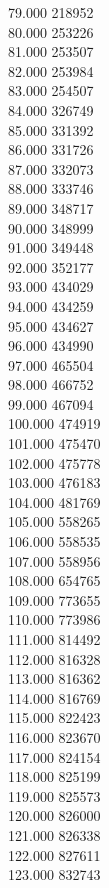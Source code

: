 { 79.000	218952 \\
 80.000	253226 \\
 81.000	253507 \\
 82.000	253984 \\
 83.000	254507 \\
 84.000	326749 \\
 85.000	331392 \\
 86.000	331726 \\
 87.000	332073 \\
 88.000	333746 \\
 89.000	348717 \\
 90.000	348999 \\
 91.000	349448 \\
 92.000	352177 \\
 93.000	434029 \\
 94.000	434259 \\
 95.000	434627 \\
 96.000	434990 \\
 97.000	465504 \\
 98.000	466752 \\
 99.000	467094 \\
 100.000	474919 \\
 101.000	475470 \\
 102.000	475778 \\
 103.000	476183 \\
 104.000	481769 \\
 105.000	558265 \\
 106.000	558535 \\
 107.000	558956 \\
 108.000	654765 \\
 109.000	773655 \\
 110.000	773986 \\
 111.000	814492 \\
 112.000	816328 \\
 113.000	816362 \\
 114.000	816769 \\
 115.000	822423 \\
 116.000	823670 \\
 117.000	824154 \\
 118.000	825199 \\
 119.000	825573 \\
 120.000	826000 \\
 121.000	826338 \\
 122.000	827611 \\
 123.000	832743 \\
}
